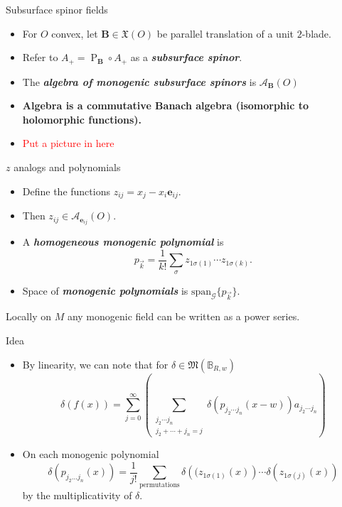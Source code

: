 \documentclass[aspectratio=169,handout]{beamer}
\newcommand\boldgreen[1]{\textcolor{lighter_csu_green}{\emph{\textbf{#1}}}}
\newcommand\boldgold[1]{\textcolor{csu_gold}{\textbf{#1}}}
\newcommand{\algebra}{\mathcal{A}}
\newcommand{\G}{\mathcal{G}}
\newcommand{\characters}{\mathfrak{M}}
\newcommand{\ball}{\mathbb{B}}
\newcommand{\projection}{\operatorname{P}}
\newcommand{\blade}[1]{\boldsymbol{#1}}
\newcommand{\bivector}{\blade{B}}
\newcommand{\smoothfields}{\mathfrak{X}}
\begin{document}
\begin{frame}{Subsurface spinor fields}
\vfill
\begin{itemize}
\pause
\item For $O$ convex, let $\bivector \in \smoothfields(O)$ be parallel translation of a unit $2$-blade.
\pause
\item Refer to $A_+ = \projection_{\bivector} \circ A_+$ as a \boldgreen{subsurface spinor}.
\pause
\item The \boldgreen{algebra of monogenic subsurface spinors} is $\algebra_{\bivector}(O)$
\pause
\item \boldgold{Algebra is a commutative Banach algebra (isomorphic to holomorphic functions).}
\item \textcolor{red}{Put a picture in here}
\end{itemize}
\vfill
\end{frame}


\begin{frame}{$z$ analogs and polynomials}
\vfill
\begin{itemize}
\pause
\item Define the functions $z_{ij}=x_j-x_i \blade{e}_{ij}$.
\pause
\item Then $z_{ij} \in \algebra_{\blade{e}_{ij}}(O)$.
\pause
\item A \boldgreen{homogeneous monogenic polynomial} is
\[
p_{\vec{k}} = \frac{1}{k!} \sum_{\sigma} z_{1\sigma(1)}\cdots z_{1\sigma(k)}.
\]
\pause
\item Space of \boldgreen{monogenic polynomials} is $\mathrm{span}_\G \{p_{\vec{k}}\}$.
\end{itemize}
\vfill
\end{frame}

\begin{frame}{}
Locally on $M$ any monogenic field can be written as a power series.
\end{frame}

\begin{frame}{Idea}
\vfill
\begin{itemize}
\pause
\item By linearity, we can note that for $\delta \in \characters(\ball_{R,w})$
\[
\delta(f(x)) = \sum_{j=0}^\infty \left(\sum_{\substack{{j_2 \cdots j_n} \\ {j_2 + \cdots + j_n = j}}} \delta(p_{j_2 \cdots j_n} (x-w)) a_{j_2 \cdots j_n} \right)
\]
\pause
\item On each monogenic polynomial
\[
\delta(p_{j_2 \dots j_n}(x)) = \frac{1}{j!} \sum_{\textrm{permutations}}\delta\left((z_{1\sigma(1)}(x)\right) \cdots \delta\left(z_{1\sigma(j)}(x)\right)
\]
by the multiplicativity of $\delta$.
\end{itemize}
\vfill
\end{frame}
\end{document}
